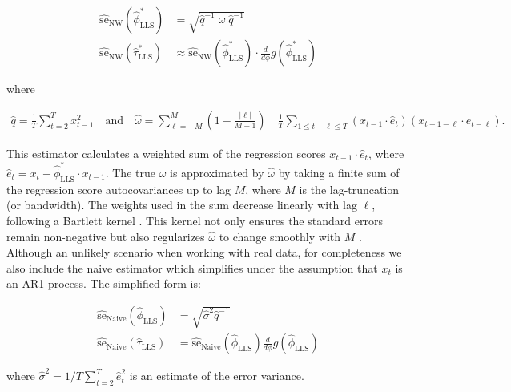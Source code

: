 \documentclass[main.tex]{subfiles}
\begin{document}
\begin{align}
\widehat{\text{se}}_{\text{NW}}(\hat\phi^*_{\scriptscriptstyle\text{LLS}}) &= \sqrt{\hat q^{-1}\;\hat\omega\; \hat q^{-1}}\\
\widehat{\text{se}}_{\text{NW}}(\hat\tau^*_{\scriptscriptstyle\text{LLS}}) &\approx \widehat{\text{se}}_{\text{NW}}(\hat\phi^*_{\scriptscriptstyle\text{LLS}}) \cdot \frac{d}{d\phi} g(\hat\phi^*_{\scriptscriptstyle\text{LLS}})
\end{align}

\noindent where

\begin{align}
    \hat q = \frac{1}{T} \sum_{t=2}^T x_{t-1}^2 \quad\text{and}\quad
    \hat \omega = \sum_{\ell=-M}^M (1 - \frac{|\ell|}{M+1}) \quad \frac{1}{T} \sum_{1\le t - \ell \le T} (x_{t-1} \cdot \hat e_t)(x_{t-1-\ell} \cdot \hat e_{t-\ell}).
\end{align}

This estimator calculates a weighted sum of the regression scores $x_{t-1} \cdot \hat e_t$, where $\hat e_t = x_t - \hat\phi^*_{\scriptscriptstyle\text{LLS}} \cdot x_{t-1}$. The true $\omega$ is approximated by $\hat \omega$ by taking a finite sum of the regression score autocovariances up to lag $M$, where $M$ is the lag-truncation (or bandwidth). The weights used in the sum decrease linearly with lag $\ell$, following a Bartlett kernel \citep{newey_simple_1987}. This kernel not only ensures the standard errors remain non-negative but also regularizes $\hat \omega$ to change smoothly with $M$ \citep[chapter~14.35]{hansen_econometrics_2022}.\\


Although an unlikely scenario when working with real data, for completeness we also include the naive estimator which simplifies under the assumption that $x_t$ is an AR1 process. The simplified form is:

\begin{align} 
    \widehat{\text{se}}_\text{Naive}(\hat\phi_{\scriptscriptstyle\text{LLS}}) &= \sqrt{\hat\sigma^2 \hat q^{-1}}\\
    \widehat{\text{se}}_\text{Naive}(\hat\tau_{\scriptscriptstyle\text{LLS}}) &= \widehat{\text{se}}_{\text{Naive}}(\hat\phi_{\scriptscriptstyle\text{LLS}}) \frac{d}{d\phi} g(\hat\phi_{\scriptscriptstyle\text{LLS}})
\end{align}

\noindent where $\hat\sigma^2 = 1/T \sum_{t=2}^T \hat e_t^2$ is an estimate of the error variance.
\end{document}
